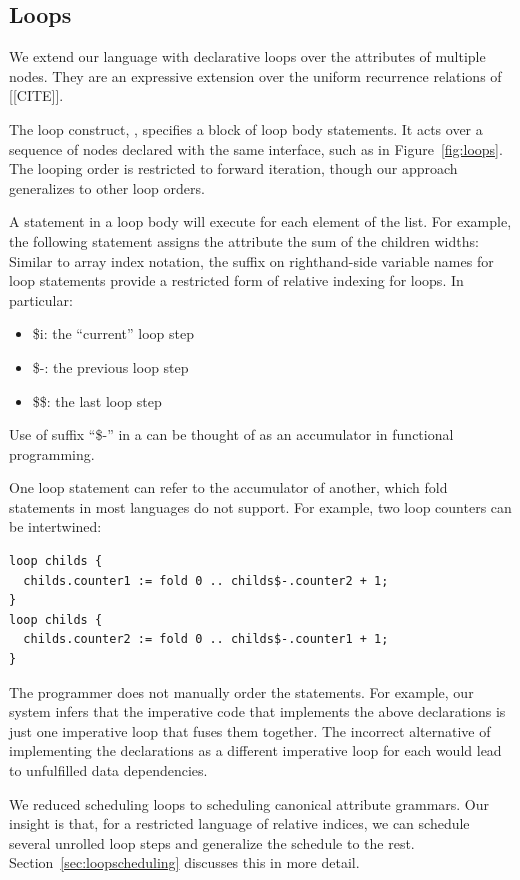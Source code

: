 \subsection{Loops}
\label{subsec:loops}
We extend our language with declarative loops over the attributes of multiple nodes. They are an expressive extension over the uniform recurrence relations of [[CITE]].

The loop construct, , specifies a block of loop body statements. It acts over a sequence of nodes declared with the same interface, such as  in Figure~\ref{fig:loops}. The looping order is restricted to forward iteration, though our approach generalizes to other loop orders.

A statement in a loop body will execute for each element of the list. For example, the following statement assigns the attribute  the sum of the children widths:
Similar to array index notation, the suffix on righthand-side variable names for loop statements provide a restricted form of relative indexing for loops. In particular:
\begin{itemize}
\item \$i: the ``current'' loop step
\item \$-: the previous loop step
\item \$\$: the last loop step
\end{itemize}
Use of suffix ``\$-'' in a  can be thought of as an accumulator in functional programming. 


One loop statement can refer to the accumulator of another, which fold statements in most languages do not support. For example, two loop counters can be intertwined:
\begin{lstlisting}
loop childs {
  childs.counter1 := fold 0 .. childs$-.counter2 + 1;
}
loop childs {
  childs.counter2 := fold 0 .. childs$-.counter1 + 1;
}
\end{lstlisting}
The programmer does not manually order the statements.  For example, our system infers that the imperative code that implements the above declarations is just one imperative loop that fuses them together. The incorrect alternative of implementing the declarations as a different imperative loop for each would lead to unfulfilled data dependencies. 

We reduced scheduling loops to scheduling canonical attribute grammars. Our insight is that, for a restricted language of relative indices, we can schedule several unrolled loop steps and generalize the schedule to the rest. Section~\ref{sec:loopscheduling} discusses this in more detail. 

